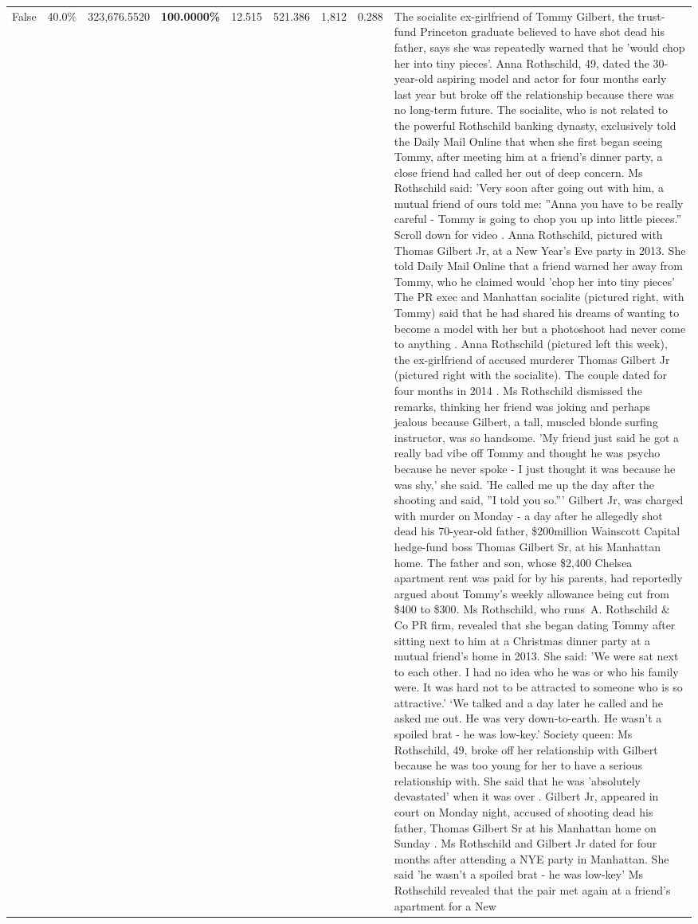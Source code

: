 \begin{table}[H]
\begin{tabular}{lllrlllll}
False & 40.0\% & 323,676.5520 & \bfseries \color{red} 100.0000\% & 12.515 & 521.386 & 1,812 & 0.288 & The socialite ex-girlfriend of Tommy Gilbert, the trust-fund Princeton graduate believed to have shot dead his father, says she was repeatedly warned that he 'would chop her into tiny pieces'. Anna Rothschild, 49, dated the 30-year-old aspiring model and actor for four months early last year but broke off the relationship because there was no long-term future. The socialite, who is not related to the powerful Rothschild banking dynasty, exclusively told the Daily Mail Online that when she first began seeing Tommy, after meeting him at a friend's dinner party, a close friend had called her out of deep concern. Ms Rothschild said: 'Very soon after going out with him, a mutual friend of ours told me: ''Anna you have to be really careful - Tommy is going to chop you up into little pieces.'' Scroll down for video . Anna Rothschild, pictured with Thomas Gilbert Jr, at a New Year's Eve party in 2013. She told Daily Mail Online that a friend warned her away from Tommy, who he claimed would 'chop her into tiny pieces' The PR exec and Manhattan socialite (pictured right, with Tommy) said that he had shared his dreams of wanting to become a model with her but a photoshoot had never come to anything . Anna Rothschild (pictured left this week), the ex-girlfriend of accused murderer Thomas Gilbert Jr (pictured right with the socialite). The couple dated for four months in 2014 . Ms Rothschild dismissed the remarks, thinking her friend was joking and perhaps jealous because Gilbert, a tall, muscled blonde surfing instructor, was so handsome. 'My friend just said he got a really bad vibe off Tommy and thought he was psycho because he never spoke - I just thought it was because he was shy,' she said. 'He called me up the day after the shooting and said, ''I told you so.''' Gilbert Jr, was charged with murder on Monday - a day after he allegedly shot dead his 70-year-old father, \$200million Wainscott Capital hedge-fund boss Thomas Gilbert Sr, at his Manhattan home. The father and son, whose \$2,400 Chelsea apartment rent was paid for by his parents, had reportedly argued about Tommy's weekly allowance being cut from \$400 to \$300. Ms Rothschild, who runs A. Rothschild \& Co PR firm, revealed that she began dating Tommy after sitting next to him at a Christmas dinner party at a mutual friend's home in 2013. She said: 'We were sat next to each other. I had no idea who he was or who his family were. It was hard not to be attracted to someone who is so attractive.' ‘We talked and a day later he called and he asked me out. He was very down-to-earth. He wasn’t a spoiled brat - he was low-key.’ Society queen: Ms Rothschild, 49, broke off her relationship with Gilbert because he was too young for her to have a serious relationship with. She said that he was 'absolutely devastated' when it was over . Gilbert Jr, appeared in court on Monday night, accused of shooting dead his father, Thomas Gilbert Sr at his Manhattan home on Sunday . Ms Rothschild and Gilbert Jr dated for four months after attending a NYE party in Manhattan. She said 'he wasn't a spoiled brat - he was low-key' Ms Rothschild revealed that the pair met again at a friend’s apartment for a New 
\end{tabular}
\end{table}
